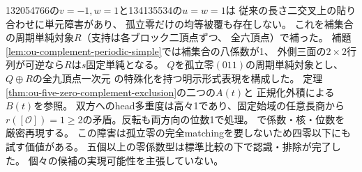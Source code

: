 \documentclass[11pt,a4paper]{ltjsarticle}
\begin{document}
132054766の$v=-1,w=1$と134135534の$u=w=1$は
従来の長さ二交叉上の貼り合わせに単元障害があり、
孤立零だけの均等被覆も存在しない。
これを補集合の周期単純対象$R$（支持は各ブロック二頂点ずつ、
全六頂点）で補った。
補題\ref{lem:ou-complement-periodic-simple}では補集合の八係数が1、
外側三面の$2\times2$行列が可逆なら$R$は$s$固定単純となる。
$Q$を孤立零$(011)$の周期単純対象とし、$Q\oplus R$の全九頂点一次元
の特殊化を持つ明示形式表現を構成した。
定理\ref{thm:ou-five-zero-complement-exclusion}の二つの$A(t)$と
正規化外積による$B(t)$を参照。
双方へのhead多重度は高々1であり、固定始域の任意長商から
$r([\mathcal O])=1\geq2$の矛盾。反転も両方向の位数1で処理。
で係数・核・位数を
厳密再現する。
この障害は孤立零の完全matchingを要しないため四零以下にも試す価値がある。
五個以上の零係数型は標準比較の下で認識・排除が完了した。
個々の候補の実現可能性を主張していない。
\end{document}
